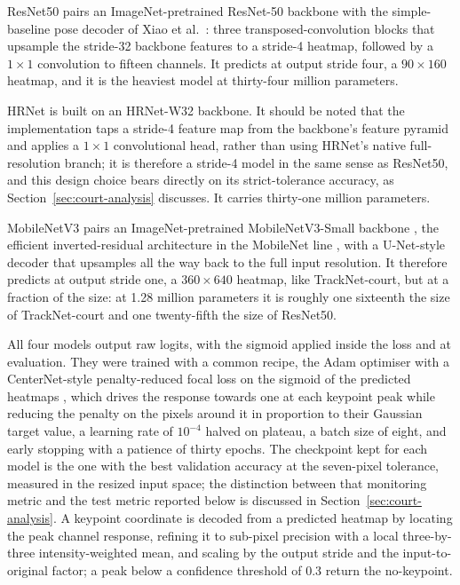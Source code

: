 ResNet50 pairs an ImageNet-pretrained ResNet-50 backbone \cite{he2016resnet} with
the simple-baseline pose decoder of Xiao et al.~\cite{xiao2018simplebaselines}:
three transposed-convolution blocks that upsample the stride-32 backbone features
to a stride-4 heatmap, followed by a $1 \times 1$ convolution to fifteen channels.
It predicts at output stride four, a $90 \times 160$ heatmap, and it is the
heaviest model at thirty-four million parameters.

HRNet is built on an HRNet-W32 backbone. It should be noted that the implementation taps a
stride-4 feature map from the backbone's feature pyramid and applies a
$1 \times 1$ convolutional head, rather than using HRNet's native
full-resolution branch; it is therefore a stride-4 model in the same sense as
ResNet50, and this design choice bears directly on its strict-tolerance accuracy,
as Section~\ref{sec:court-analysis} discusses. It carries thirty-one million
parameters.

MobileNetV3 pairs an ImageNet-pretrained MobileNetV3-Small backbone
\cite{howard2019mobilenetv3}, the efficient inverted-residual architecture in the
MobileNet line \cite{sandler2018mobilenetv2}, with a U-Net-style decoder that
upsamples all the way back to the full input resolution. It therefore predicts at
output stride one, a $360 \times 640$ heatmap, like TrackNet-court, but at a
fraction of the size: at 1.28 million parameters it is roughly one sixteenth the
size of TrackNet-court and one twenty-fifth the size of ResNet50.

All four models output raw logits, with the sigmoid applied inside the loss and
at evaluation. They were trained with a common recipe, the Adam optimiser
\cite{kingma2015adam} with a CenterNet-style penalty-reduced focal loss on the
sigmoid of the predicted heatmaps \cite{zhou2019centernet}, which drives the
response towards one at each keypoint peak while reducing the penalty on the
pixels around it in proportion to their Gaussian target value, a learning rate of
$10^{-4}$ halved on plateau, a batch size of eight, and early stopping with a
patience of thirty epochs. The checkpoint kept for each model is the one with the best validation
accuracy at the seven-pixel tolerance, measured in the resized input space; the
distinction between that monitoring metric and the test metric reported below is
discussed in Section~\ref{sec:court-analysis}. A keypoint coordinate is decoded
from a predicted heatmap by locating the peak channel response, refining it to
sub-pixel precision with a local three-by-three intensity-weighted mean, and
scaling by the output stride and the input-to-original factor; a peak below a
confidence threshold of 0.3 return the no-keypoint.

